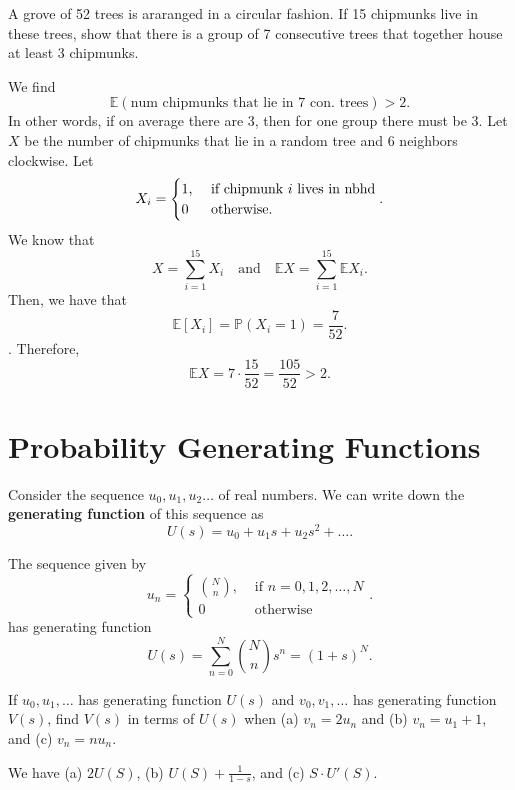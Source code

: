 \begin{eg}
	A grove of 52 trees is araranged in a circular fashion. If 15 chipmunks live in these trees, show that there is a group of 7 consecutive trees that together house at least 3 chipmunks.
\end{eg}
\begin{explanation}
	We find \[
		\mathbb{E}(\text{num chipmunks that lie in 7 con. trees}) > 2
	.\] In other words, if on average there are 3, then for one group there must be 3. Let \( X \) be the number of chipmunks that lie in a random tree and 6 neighbors clockwise. Let \[
		X_i = \begin{cases}
			1, &\text{ if chipmunk \( i \) lives in nbhd}\\
			0 &\text{ otherwise.}
		\end{cases}
	.\]  We know that \[
		X = \sum_{i=1}^{15} X_i \quad \text{and}\quad \mathbb{E}X = \sum_{i=1}^{15} \mathbb{E}X_i
	.\] Then, we have that \[
		\mathbb{E}[X_i] = \mathbb{P}(X_i=1) = \frac{7}{52}
	.\]. Therefore, \[
		\mathbb{E}X = 7 \cdot \frac{15}{52} = \frac{105}{52} > 2
	.\] 
\end{explanation}

\section{Probability Generating Functions}

\begin{definition}
	Consider the sequence \( u_{0},u_{1},u_{2}\ldots  \) of real numbers. We can write down the \textbf{generating function}  of this sequence as \[
		U(s) = u_{0} + u_{1}s + u_{2}s^{2} + \ldots 
	.\] 
\end{definition}

\begin{eg}
	The sequence given by \[
		u_n = \begin{cases}
			\binom{N}{n}, &\text{ if } n = 0, 1, 2, \ldots , N\\
			0 &\text{ otherwise}
		\end{cases}
	.\] has generating function \[
		U(s) = \sum_{n=0}^{N} \binom{N}{n} s^{n}  = (1+s)^{N} 
	.\] 
\end{eg}

\begin{eg}
	If \( u_{0}, u_{1}, \ldots  \) has generating function \( U(s) \) and \( v_{0}, v_{1}, \ldots  \) has generating function \( V(s) \), find \( V(s) \) in terms of \( U(s) \) when (a) \( v_n = 2u_n \) and (b) \( v_n = u_1 + 1 \), and (c) \( v_n = n u_n \).
\end{eg}
\begin{explanation}
	We have (a) \( 2U(S) \), (b) \( U(S) + \frac{1}{1-s} \), and (c) \( S \cdot U'(S) \).
\end{explanation}
